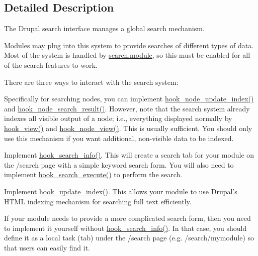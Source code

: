 \subsection{Detailed Description}
The Drupal search interface manages a global search mechanism.

Modules may plug into this system to provide searches of different types of data. Most of the system is handled by \hyperlink{search_8module}{search.module}, so this must be enabled for all of the search features to work.

There are three ways to interact with the search system:
\begin{DoxyItemize}
\item Specifically for searching nodes, you can implement \hyperlink{group__node__api__hooks_gac8420f204c69a4dc641f4d809a870b05}{hook\_\-node\_\-update\_\-index()} and \hyperlink{group__node__api__hooks_ga8644320a0e04e3a503c99626d4223725}{hook\_\-node\_\-search\_\-result()}. However, note that the search system already indexes all visible output of a node; i.e., everything displayed normally by \hyperlink{group__node__api__hooks_gab1f229603b5e0f2f9d9e2a3ab53dcbda}{hook\_\-view()} and \hyperlink{group__node__api__hooks_ga475290ee8e81a2373ea17c512cc3f9a9}{hook\_\-node\_\-view()}. This is usually sufficient. You should only use this mechanism if you want additional, non-\/visible data to be indexed.
\item Implement \hyperlink{group__search_ga37b761616f2cad4796891008f2b374f3}{hook\_\-search\_\-info()}. This will create a search tab for your module on the /search page with a simple keyword search form. You will also need to implement \hyperlink{group__search_ga00be3e4a3b64ad73f8ad1304a450cee5}{hook\_\-search\_\-execute()} to perform the search.
\item Implement \hyperlink{group__search_ga23d6f6642bd53c4f033f10e9c1b12d43}{hook\_\-update\_\-index()}. This allows your module to use Drupal's HTML indexing mechanism for searching full text efficiently.
\end{DoxyItemize}

If your module needs to provide a more complicated search form, then you need to implement it yourself without \hyperlink{group__search_ga37b761616f2cad4796891008f2b374f3}{hook\_\-search\_\-info()}. In that case, you should define it as a local task (tab) under the /search page (e.g. /search/mymodule) so that users can easily find it. 

